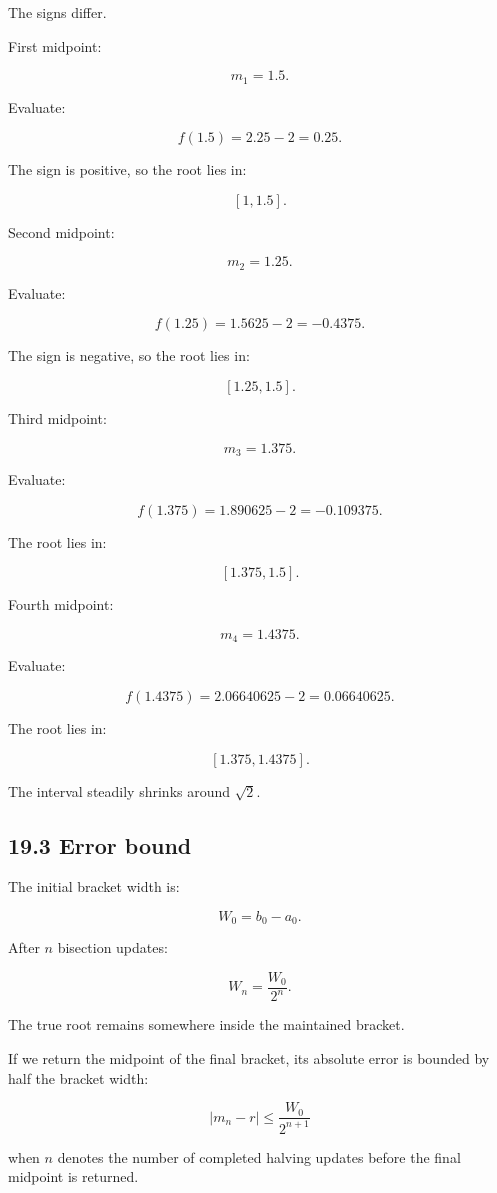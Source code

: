 The signs differ.

First midpoint:

\[ m_1=1.5. \]

Evaluate:

\[ f(1.5)=2.25-2=0.25. \]

The sign is positive, so the root lies in:

\[ [1,1.5]. \]

Second midpoint:

\[ m_2=1.25. \]

Evaluate:

\[ f(1.25)=1.5625-2=-0.4375. \]

The sign is negative, so the root lies in:

\[ [1.25,1.5]. \]

Third midpoint:

\[ m_3=1.375. \]

Evaluate:

\[ f(1.375)=1.890625-2=-0.109375. \]

The root lies in:

\[ [1.375,1.5]. \]

Fourth midpoint:

\[ m_4=1.4375. \]

Evaluate:

\[ f(1.4375)=2.06640625-2=0.06640625. \]

The root lies in:

\[ [1.375,1.4375]. \]

The interval steadily shrinks around \(\sqrt2\).

\subsection{19.3 Error bound}\label{02-foundations-ii-ch028-error-bound}

The initial bracket width is:

\[ W_0=b_0-a_0. \]

After \(n\) bisection updates:

\[ \boxed{ W_n=\frac{W_0}{2^n} }. \]

The true root remains somewhere inside the maintained bracket.

If we return the midpoint of the final bracket, its absolute error is bounded by half the bracket width:

\[ \boxed{ |m_n-r| \le \frac{W_0}{2^{n+1}} } \]

when \(n\) denotes the number of completed halving updates before the final midpoint is returned.

